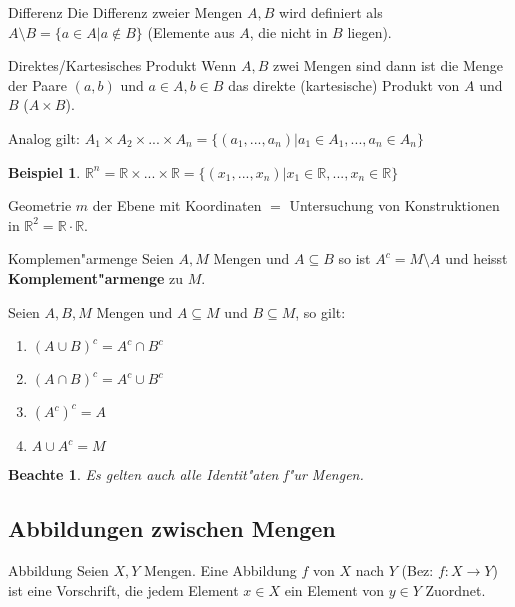 \documentclass[11pt]{article}
\newtheorem{exa}{Beispiel}[section]
\newtheorem*{notte}{Beachte}
\begin{document}
\begin{definition}{Differenz}{}
Die Differenz zweier Mengen \(A, B\) wird definiert als \(A\setminus B = \{a\in A | a\not\in
B\}\) (Elemente aus \(A\), die nicht in \(B\) liegen). 
\end{definition}

\begin{definition}{Direktes/Kartesisches Produkt}{}
Wenn \(A,B\) zwei Mengen sind dann ist die Menge der Paare \((a,b)\) und \(a\in A,
b\in B\) das direkte (kartesische) Produkt von \(A\) und \(B\) (\(A\times B\)).
\end{definition}

Analog gilt: \(A_1\times A_2\times ... \times A_n = \{(a_1,...,a_n)| a_1\in A_1,...,a_n\in A_n\}\)

\begin{exa}
\(\mathbb{R}^n=\mathbb{R}\times ... \times \mathbb{R} =  \{(x_1,...,x_n)| x_1\in \mathbb{R},...,x_n\in \mathbb{R}\}\)
\end{exa}

Geometrie \(m\) der Ebene mit Koordinaten \(=\) Untersuchung von Konstruktionen in
\(\mathbb{R}^2=\mathbb{R}\cdot\mathbb{R}\).

\begin{definition}{Komplemen"armenge}
Seien \(A,M\) Mengen und \(A\subseteq B\) so ist \(A^c = M\setminus A\) und heisst
\textbf{Komplement"armenge} zu \(M\).
\end{definition}

Seien \(A,B,M\) Mengen und \(A\subseteq M\) und \(B\subseteq M\), so gilt:
\begin{relation}
\begin{enumerate}
\item \((A\cup B)^c = A^c \cap B^c\)
\item \((A\cap B)^c = A^c \cup B^c\)
\item \((A^c)^c = A\)
\item \(A\cup A^c = M\)
\end{enumerate}
\end{relation}

\begin{notte}
Es gelten auch alle Identit"aten f"ur Mengen.
\end{notte}


\subsection{Abbildungen zwischen Mengen}
\label{sec:org4ef8946}
\begin{definition}{Abbildung}{}
Seien \(X,Y\) Mengen. Eine Abbildung \(f\) von \(X\) nach \(Y\) (Bez: \(f:X\rightarrow
Y\)) ist eine Vorschrift, die jedem Element \(x\in X\) ein Element von
\(y\in Y\) Zuordnet.
\end{definition}
\end{document}
